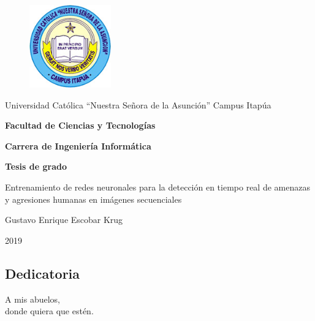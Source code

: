 \documentclass[a4paper,12pt,oneside,spanish]{book}
\begin{document}
\thispagestyle{empty}
\begin{figure}[h!]
	\includegraphics[width=100pt]{Imagenes/logo.png}
	\centering
\end{figure}
\vspace*{0.1cm}
\begin{center}
	{\LARGE {Universidad Católica ``Nuestra Señora de la Asunción'' Campus Itapúa}}
\end{center}
\vspace*{0.1cm}
\begin{center}
	{\large \rm \textbf {Facultad de Ciencias y Tecnologías}}
\end{center}
\vspace*{0.1cm}
\begin{center}
	{\large \rm \textbf {Carrera de Ingeniería Informática}}
\end{center}	
\vspace*{0.2cm}
\begin{center}
	{\large \rm \textbf {Tesis de grado}}
\end{center}
	
\baselineskip 30pt
\vspace*{1cm}
\begin{center}
	{\large \rm Entrenamiento de redes neuronales para la detección en tiempo real de amenazas y agresiones humanas en imágenes secuenciales}
\end{center}

\vspace*{1cm}

\begin{center}
	{\sc  Gustavo Enrique Escobar Krug\\}
	\vspace*{0.1cm}
	
\end{center}
\vspace*{2cm}
\begin{center}
	{\large \rm 2019}
\end{center}




\newpage
\clearpage
\thispagestyle{fancy}
\setcounter{page}{1}
\setlength{\parskip}{1.3em}
\begin{flushright}
	\subsection*{Dedicatoria}
	A mis abuelos, \\
	donde quiera que estén.
\end{flushright}
\end{document}
